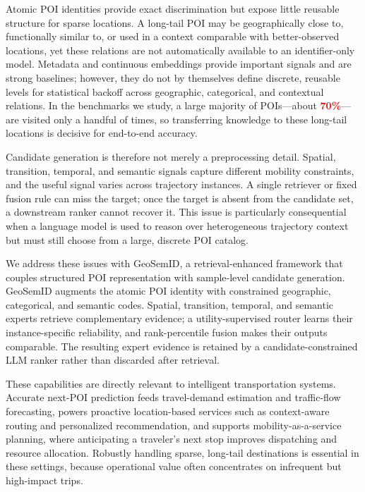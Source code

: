 \documentclass[journal]{IEEEtran}
\newcommand{\mock}[1]{\textbf{\textcolor{red}{#1}}}
\begin{document}
Atomic POI identities provide exact discrimination but expose little reusable
structure for sparse locations. A long-tail POI may be geographically close to,
functionally similar to, or used in a context comparable with better-observed
locations, yet these relations are not automatically available to an
identifier-only model. Metadata and continuous embeddings provide important
signals and are strong baselines; however, they do not by themselves define
discrete, reusable levels for statistical backoff across geographic,
categorical, and contextual relations. In the benchmarks we study, a large
majority of POIs---about \mock{70\%}---are visited only a handful of times, so
transferring knowledge to these long-tail locations is decisive for end-to-end
accuracy.

Candidate generation is therefore not merely a preprocessing detail. Spatial,
transition, temporal, and semantic signals capture different mobility
constraints, and the useful signal varies across trajectory instances. A
single retriever or fixed fusion rule can miss the target; once the target is
absent from the candidate set, a downstream ranker cannot recover it. This
issue is particularly consequential when a language model is used to reason
over heterogeneous trajectory context but must still choose from a large,
discrete POI catalog.

We address these issues with GeoSemID, a retrieval-enhanced framework that
couples structured POI representation with sample-level candidate generation.
GeoSemID augments the atomic POI identity with constrained geographic,
categorical, and semantic codes. Spatial, transition, temporal, and semantic
experts retrieve complementary evidence; a utility-supervised router learns
their instance-specific reliability, and rank-percentile fusion makes their
outputs comparable. The resulting expert evidence is retained by a
candidate-constrained LLM ranker rather than discarded after retrieval.

These capabilities are directly relevant to intelligent transportation systems.
Accurate next-POI prediction feeds travel-demand estimation and traffic-flow
forecasting, powers proactive location-based services such as context-aware
routing and personalized recommendation, and supports mobility-as-a-service
planning, where anticipating a traveler's next stop improves dispatching and
resource allocation. Robustly handling sparse, long-tail destinations is
essential in these settings, because operational value often concentrates on
infrequent but high-impact trips.
\end{document}
